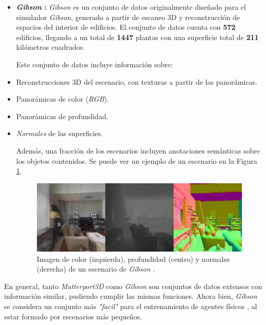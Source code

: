 \begin{itemize}
	\item \textbf{\textit{Gibson} \cite{xiazamirhe2018gibsonenv}:}	\textit{Gibson} es un conjunto de datos originalmente diseñado para el simulador \textit{Gibson}, generado a partir de escaneo 3D y reconstrucción de espacios del interior de edificios. El conjunto de datos cuenta con \textbf{572} edificios, llegando a un total de \textbf{1447} plantas con una superficie total de \textbf{211} kilómetros cuadrados.
	
	Este conjunto de datos incluye información sobre:
	\item Reconstrucciones 3D del escenario, con texturas a partir de las panorámicas.
		\item Panorámicas de color (\textit{RGB}).
		\item Panorámicas de profundidad.
		\item \textit{Normales} de las superficies.
		
	Además, una fracción de los escenarios incluyen anotaciones semánticas sobre los objetos contenidos. Se puede ver un ejemplo de un escenario en la Figura \ref{fig:chap4-gibson}.

\begin{figure}[h]
    \centering
    \includegraphics[width=\textwidth]{imagenes/cap4/gibson.jpg}
    \caption{Imagen de color (izquierda), profundidad (centro) y normales (derecha) de un escenario de \textit{Gibson} \cite{xiazamirhe2018gibsonenv}.}
    \label{fig:chap4-gibson}
\end{figure}

\end{itemize}

En general, tanto \textit{Matterport3D} como \textit{Gibson} son conjuntos de datos extensos con información similar, pudiendo cumplir las mismas funciones. Ahora bien, \textit{Gibson} se considera un conjunto más \textit{"facil"} para el entrenamiento de agentes físicos \cite{habitat19iccv}, al estar formado por escenarios más pequeños.

